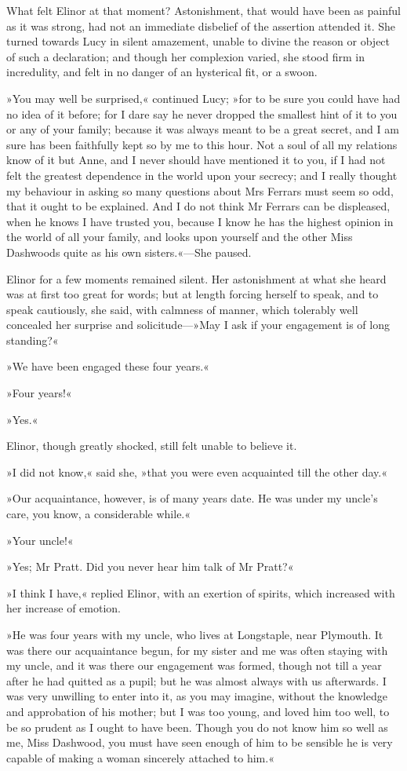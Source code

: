 What felt Elinor at that moment? Astonishment, that would have been as painful as it was strong, had not an immediate disbelief of the assertion attended it. She turned towards Lucy in silent amazement, unable to divine the reason or object of such a declaration; and though her complexion varied, she stood firm in incredulity, and felt in no danger of an hysterical fit, or a swoon.

»You may well be surprised,« continued Lucy; »for to be sure you could have had no idea of it before; for I dare say he never dropped the smallest hint of it to you or any of your family; because it was always meant to be a great secret, and I am sure has been faithfully kept so by me to this hour. Not a soul of all my relations know of it but Anne, and I never should have mentioned it to you, if I had not felt the greatest dependence in the world upon your secrecy; and I really thought my behaviour in asking so many questions about Mrs Ferrars must seem so odd, that it ought to be explained. And I do not think Mr Ferrars can be displeased, when he knows I have trusted you, because I know he has the highest opinion in the world of all your family, and looks upon yourself and the other Miss Dashwoods quite as his own sisters.«—She paused.

Elinor for a few moments remained silent. Her astonishment at what she heard was at first too great for words; but at length forcing herself to speak, and to speak cautiously, she said, with calmness of manner, which tolerably well concealed her surprise and solicitude—»May I ask if your engagement is of long standing?«

»We have been engaged these four years.«

»Four years!«

»Yes.«

Elinor, though greatly shocked, still felt unable to believe it.

»I did not know,« said she, »that you were even acquainted till the other day.«

»Our acquaintance, however, is of many years date. He was under my uncle’s care, you know, a considerable while.«

»Your uncle!«

»Yes; Mr Pratt. Did you never hear him talk of Mr Pratt?«

»I think I have,« replied Elinor, with an exertion of spirits, which increased with her increase of emotion.

»He was four years with my uncle, who lives at Longstaple, near Plymouth. It was there our acquaintance begun, for my sister and me was often staying with my uncle, and it was there our engagement was formed, though not till a year after he had quitted as a pupil; but he was almost always with us afterwards. I was very unwilling to enter into it, as you may imagine, without the knowledge and approbation of his mother; but I was too young, and loved him too well, to be so prudent as I ought to have been. Though you do not know him so well as me, Miss Dashwood, you must have seen enough of him to be sensible he is very capable of making a woman sincerely attached to him.«

